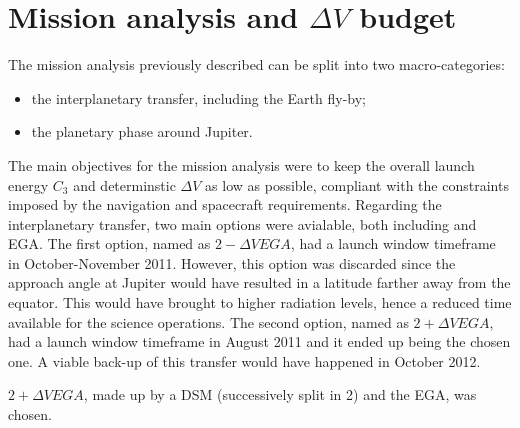 \section{Mission analysis and \texorpdfstring{$\Delta V$}{Delta-V} budget}
\label{sec:ma_and_dv}
The mission analysis previously described can be split into two macro-categories:
\begin{itemize}
    \item the interplanetary transfer, including the Earth fly-by;
    \item the planetary phase around Jupiter.
\end{itemize}
The main objectives for the mission analysis were to keep the overall launch energy $C_3$ and determinstic $\Delta V$ as low as possible, compliant with the constraints imposed by the navigation and spacecraft requirements. Regarding the interplanetary transfer, two main options were avialable, both including and EGA. The first option, named as $2-\Delta V EGA$, had a launch window timeframe in October-November 2011. However, this option was discarded since the approach angle at Jupiter would have resulted in a latitude farther away from the equator. This would have brought to higher radiation levels, hence a reduced time available for the science operations. The second option, named as $2+\Delta V EGA$, had a launch window timeframe in August 2011 and it ended up being the chosen one. A viable back-up of this transfer would have happened in October 2012. 







$2+\Delta V EGA$, made up by a DSM (successively split in 2) and the EGA, was chosen.






\cite{fact_sheet}
